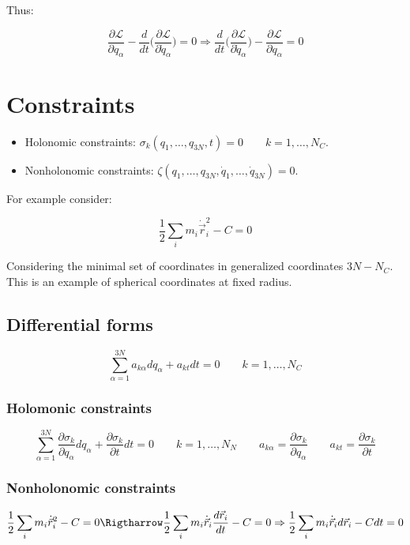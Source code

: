 	Thus:

	$$\frac{\partial\mathcal{L}}{\partial q_\alpha} - \frac{d}{dt}\biggl(\frac{\partial\mathcal{L}}{\partial\dot{q}_\alpha}\biggr) = 0\Rightarrow \frac{d}{dt}\biggl(\frac{\partial\mathcal{L}}{\partial\dot{q}_\alpha}\biggr)-\frac{\partial\mathcal{L}}{\partial q_\alpha} = 0$$

\section{Constraints}

\begin{itemize}
	\item Holonomic constraints: $\sigma_k(q_1, \dots, q_{3N}, t) = 0\qquad k = 1, \dots, N_C$.
	\item Nonholonomic constraints: $\zeta(q_1, \dots, q_{3N}, \dot{q}_1, \dots, \dot{q}_{3N}) = 0$.
\end{itemize}

For example consider:

$$\frac{1}{2}\sum\limits_{i}m_i\dot{\vec{r}}_i^2-C = 0$$

Considering the minimal set of coordinates in generalized coordinates $3N-N_C$.
This is an example of spherical coordinates at fixed radius.

	\subsection{Differential forms}

	$$\sum\limits_{\alpha = 1}^{3N} a_{k\alpha}dq_\alpha + a_{kt}dt = 0\qquad k = 1, \dots, N_C$$


		\subsubsection{Holomonic constraints}

		$$\sum\limits_{\alpha=1}^{3N}\frac{\partial\sigma_k}{\partial q_\alpha}dq_\alpha + \frac{\partial\sigma_k}{\partial t} dt = 0\qquad k = 1, \dots, N_N\qquad a_{k\alpha} = \frac{\partial\sigma_k}{\partial q_\alpha}\qquad a _{kt} = \frac{\partial\sigma_k}{\partial t}$$

		\subsubsection{Nonholonomic constraints}

		$$\frac{1}{2}\sum\limits_i m_i\dot{\vec{r}}_i^2 - C = 0\Rigtharrow\frac{1}{2}\sum\limits_i m_i\dot{\vec{r}}_i\frac{d\vec{r}_i}{dt} - C = 0\Rightarrow\frac{1}{2}\sum\limits_i m_i\dot{\vec{r}}_id\vec{r}_i-Cdt = 0$$


